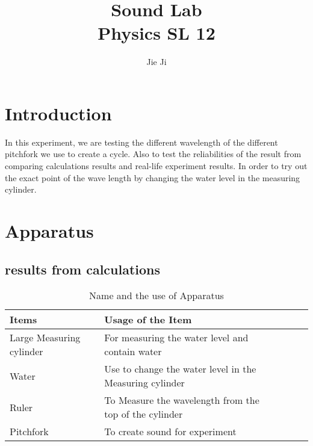 \documentclass{article}
\begin{document}
\title{Sound Lab \\ Physics SL 12} %
\author{Jie Ji} %

\maketitle %
\large

\section{Introduction}
In this experiment, we are testing the different wavelength of the different pitchfork we use to create a cycle.
Also to test the reliabilities of the result from comparing calculations results and real-life experiment results. 
In order to try out the exact point of the wave length by changing the water level in the measuring cylinder.
\section{Apparatus}
\subsection{results from calculations}
\begin{table}[htbp]
\begin{center}
\footnotesize
\begin{tabular}{lllll}
\toprule
Items   & Usage of the Item                                                         \\
\midrule
Large Measuring cylinder & For measuring the water level and contain water\\
Water & Use to change the water level in the Measuring cylinder\\
Ruler & To Measure the wavelength from the top of the cylinder\\
Pitchfork & To create sound for experiment\\
\bottomrule
\end{tabular}
\end{center}
  \caption{Name and the use of Apparatus}
  \label{tab:font-sizes}
\end{table}
\end{document}
